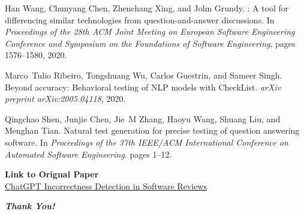 \begin{frame}[allowframebreaks]
\begin{thebibliography}{10}
  Han Wang, Chunyang Chen, Zhenchang Xing, and John Grundy.
  : A tool for differencing similar technologies from
    question-and-answer discussions.
  \newblock In \emph{Proceedings of the 28th ACM Joint Meeting on European
    Software Engineering Conference and Symposium on the Foundations of Software
    Engineering}, pages 1576--1580, 2020.
  
  Marco~Tulio Ribeiro, Tongshuang Wu, Carlos Guestrin, and Sameer Singh.
  \newblock Beyond accuracy: Behavioral testing of {NLP} models with {CheckList}.
  \newblock \emph{arXiv preprint arXiv:2005.04118}, 2020.

  Qingchao Shen, Junjie Chen, Jie~M Zhang, Haoyu Wang, Shuang Liu, and Menghan Tian.
  \newblock Natural test generation for precise testing of question answering software. In {\emph{Proceedings of the 37th IEEE/ACM International Conference on Automated Software Engineering}}. pages 1--12.

  \vspace{0.5cm}
  \textbf{\Large Link to Orignal Paper\\}
  \href{https://dl.acm.org/doi/abs/10.1145/3597503.3639194}{ChatGPT Incorrectness Detection in Software Reviews}
  
  \end{thebibliography}
  
  \end{frame}

  

\begin{frame}
  \begin{center}
    \vspace{1cm} %
    {\Huge \textbf{\textit{Thank You!}}} %
  \end{center}
\end{frame}







